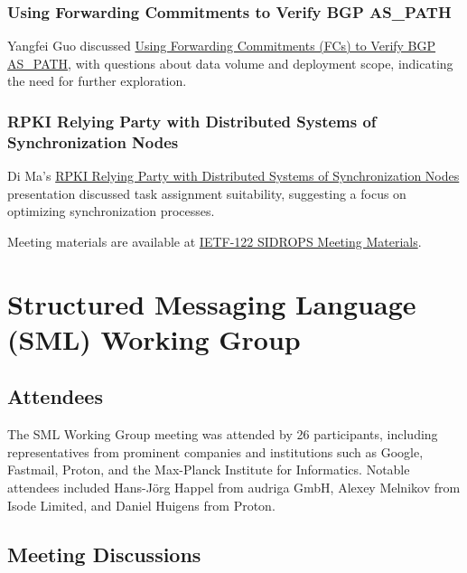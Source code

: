 \documentclass{article}
\begin{document}
\subsubsection{Using Forwarding Commitments to Verify BGP AS\_PATH}
Yangfei Guo discussed \href{https://datatracker.ietf.org/meeting/122/materials/slides-122-sidrops-using-forwarding-commitments-fcs-to-verify-bgp-as-path-00}{Using Forwarding Commitments (FCs) to Verify BGP AS\_PATH}, with questions about data volume and deployment scope, indicating the need for further exploration.

\subsubsection{RPKI Relying Party with Distributed Systems of Synchronization Nodes}
Di Ma's \href{https://datatracker.ietf.org/meeting/122/materials/slides-122-sidrops-rpki-relying-party-with-distributed-systems-of-synchronization-nodes-00}{RPKI Relying Party with Distributed Systems of Synchronization Nodes} presentation discussed task assignment suitability, suggesting a focus on optimizing synchronization processes.

Meeting materials are available at \href{https://datatracker.ietf.org/meeting/122/materials/agenda-122-sidrops-00}{IETF-122 SIDROPS Meeting Materials}.



\newpage

\section{Structured Messaging Language (SML) Working Group}

\subsection{Attendees}
The SML Working Group meeting was attended by 26 participants, including representatives from prominent companies and institutions such as Google, Fastmail, Proton, and the Max-Planck Institute for Informatics. Notable attendees included Hans-Jörg Happel from audriga GmbH, Alexey Melnikov from Isode Limited, and Daniel Huigens from Proton.

\subsection{Meeting Discussions}
\end{document}
